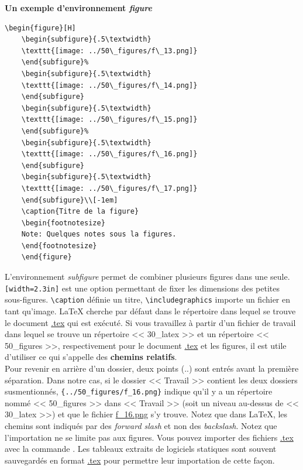 \documentclass[12pt]{article}
\begin{document}
	\textbf{Un exemple d'environnement \textit{figure}} \\
	\begin{lstlisting}[frame=single]
	\begin{figure}[H]
	\begin{subfigure}{.5\textwidth}
	\texttt{[image: ../50\_figures/f\_13.png]} 
	\end{subfigure}%
	\begin{subfigure}{.5\textwidth}
	\texttt{[image: ../50\_figures/f\_14.png]}
	\end{subfigure}
	\begin{subfigure}{.5\textwidth}
	\texttt{[image: ../50\_figures/f\_15.png]}
	\end{subfigure}%
	\begin{subfigure}{.5\textwidth}
	\texttt{[image: ../50\_figures/f\_16.png]}
	\end{subfigure}
	\begin{subfigure}{.5\textwidth}
	\texttt{[image: ../50\_figures/f\_17.png]}
	\end{subfigure}\\[-1em]
	\caption{Titre de la figure}
	\begin{footnotesize}
	Note: Quelques notes sous la figures.
	\end{footnotesize}
	\end{figure}
	\end{lstlisting}
	
	L'environnement \textit{subfigure} permet de combiner plusieurs figures dans une seule. \lstinline|[width=2.3in]| est une option permettant de fixer les dimensions des petites sous-figures. \lstinline|\caption| définie un titre, \lstinline|\includegraphics| importe un fichier en tant qu'image. LaTeX cherche par défaut dans le répertoire dans lequel se trouve le document \url{.tex} qui est exécuté. Si vous travaillez à partir d'un fichier de travail dans lequel se trouve un répertoire << 30\_latex >> et un répertoire << 50\_figures >>, respectivement pour le document \url{.tex} et les figures, il est utile d'utiliser ce qui s'appelle des \textbf{chemins relatifs}.\\
	
	Pour revenir en arrière d'un dossier, deux points (..) sont entrés avant la première séparation. Dans notre cas, si le dossier << Travail >> contient les deux dossiers susmentionnés, \lstinline|{../50_figures/f_16.png}| indique qu'il y a un répertoire nommé << 50\_figures >> dans << Travail >> (soit un niveau au-dessus de << 30\_latex >>) et que le fichier \url{f_16.png} s'y trouve. Notez que dans LaTeX, les chemins sont indiqués par des \textit{forward slash} et non des \textit{backslash}. Notez que l'importation ne se limite pas aux figures. Vous pouvez importer des fichiers \url{.tex} avec la commande \lstinline||. Les tableaux extraits de logiciels statiques sont souvent sauvegardés en format \url{.tex} pour permettre leur importation de cette façon. \\
	
\end{document}
